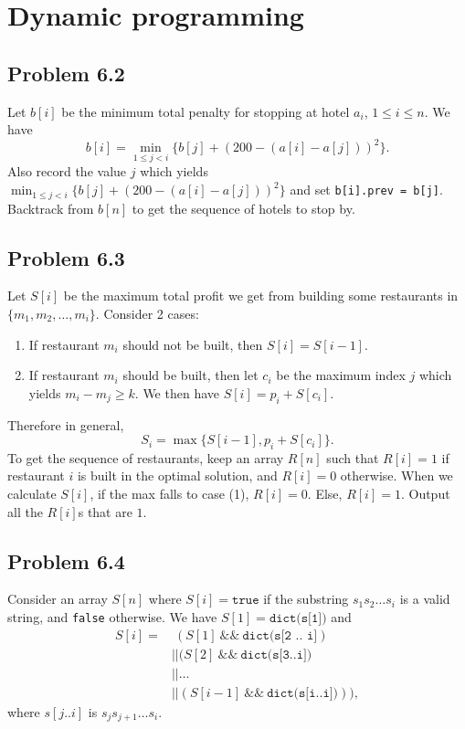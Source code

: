 \documentclass[12pt]{report}
\newcommand{\co}{\texttt}
\renewcommand{\and}{\ \&\& \ }
\begin{document}
\chapter[Chapter 6 Solution]{Dynamic programming}
\section{Problem 6.2}
Let $b[i]$ be the minimum total penalty for stopping at hotel $a_i$, $1 \le i \le n$. We have $$b[i] = \min_{1 \le j < i} \{ b[j] + (200 - (a[i] - a[j]))^2\}.$$
Also record the value $j$ which yields $\displaystyle \min_{1 \le j < i} \{ b[j] + (200 - (a[i] - a[j]))^2\}$ and set \co{b[i].prev = b[j]}. Backtrack from $b[n]$ to get the sequence of hotels to stop by.


\section{Problem 6.3}
Let $S[i]$ be the maximum total profit we get from building some restaurants in $\{m_1, m_2, \ldots, m_i\}$. Consider 2 cases:
\begin{enumerate}[(1)]
  \item If restaurant $m_i$ should not be built, then $S[i] = S[i-1]$.
  \item If restaurant $m_i$ should be built, then let $c_i$ be the maximum index $j$ which yields $m_i - m_j \ge k$. We then have $\displaystyle S[i] = p_i + S[c_i]$.
\end{enumerate}
Therefore in general, $$S_i = \max \{ S[i-1], p_i + S[c_i]\}.$$
To get the sequence of restaurants, keep an array $R[n]$ such that $R[i] = 1$ if restaurant $i$ is built in the optimal solution, and $R[i] = 0$ otherwise. When we calculate $S[i]$, if the max falls to case (1), $R[i] = 0$. Else, $R[i] = 1$. Output all the $R[i]$s that are $1$.

\section{Problem 6.4}
Consider an array $S[n]$ where $S[i] = \co{true}$ if the substring $s_1 s_2 \ldots s_i$ is a valid string, and \co{false} otherwise. We have $S[1] = \co{dict(s[1])}$ and 
$$
\begin{aligned}
S[i] = & \ (S[1] \and \co{dict(s[2 .. i]}) \\ 
& || (S[2] \and \co{dict(s[3..i])} \\ 
& || \ldots \\
& || (S[i-1] \and \co{dict(s[i..i])})), 
\end{aligned}$$
where $s[j..i]$ is $s_j s_{j+1} \ldots s_i$.
\end{document}
